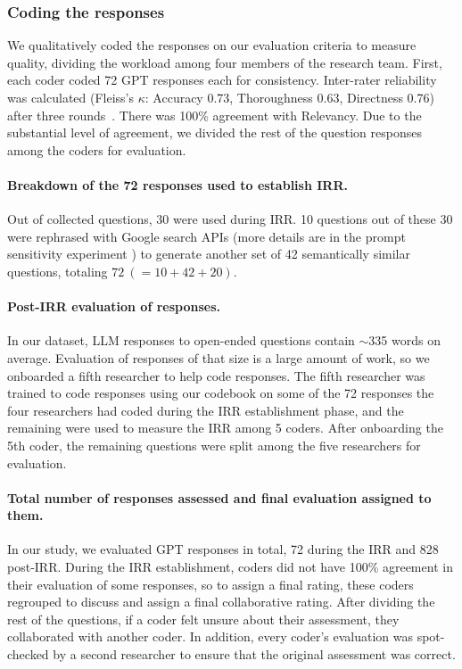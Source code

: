 \subsubsection{Coding the responses} %
\label{irr-establishment}

We qualitatively coded the responses on our evaluation criteria to measure quality, dividing the workload among four members of the research team. 
First, each coder coded 72 GPT responses each for consistency. Inter-rater reliability was calculated (Fleiss’s $\kappa$: Accuracy 0.73, Thoroughness 0.63, Directness 0.76) after three rounds~\cite{mchugh2012-irr}. There was 100\% agreement with Relevancy. Due to the substantial level of agreement, we divided the rest of the question responses among the coders for evaluation.










\paragraph{Breakdown of the 72 responses used to establish IRR.} %
Out of \questionsCollected collected questions, 30 were used during IRR. 10 questions out of these 30 were rephrased with Google search APIs (more details are in the prompt sensitivity experiment ) to generate another set of 42 semantically similar questions, totaling $72\ (=10 + 42 + 20)$.

\paragraph{Post-IRR evaluation of \postIRRQuestions responses.} In our dataset, LLM responses to open-ended questions contain $\sim$335 words on average. Evaluation of \postIRRQuestions responses of that size is a large amount of work, so we onboarded a fifth researcher to help code responses. The fifth researcher was trained to code responses using our codebook on some of the 72 responses the four researchers had coded during the IRR establishment phase, and the remaining were used to measure the IRR among 5 coders. After onboarding the 5th coder, the remaining \postIRRQuestions questions were split among the five researchers for evaluation. 





 \paragraph{Total number of responses assessed and final evaluation assigned to them.} In our study, we evaluated \questionsEvaluated GPT responses in total, 72 during the IRR and 828 post-IRR. During the IRR establishment, coders did not have 100\% agreement in their evaluation of some responses, so to assign a final rating, these coders regrouped to discuss and assign a final collaborative rating. After dividing the rest of the questions, if a coder felt unsure about their assessment, they collaborated with another coder. In addition, every coder's evaluation was spot-checked by a second researcher to ensure that the original assessment was correct.

